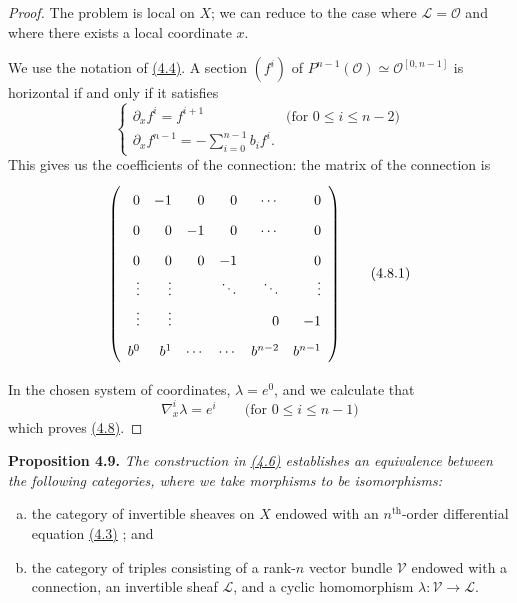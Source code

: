 \documentclass{report}
\newenvironment{itenv}[1]
  {\phantomsection\par\medskip\noindent\textbf{#1.}\itshape}
  {\medskip}
\newcommand{\scr}[1]{{\mathscr{#1}}}
\renewcommand{\cal}[1]{{\mathcal{#1}}}
\renewcommand{\leq}{\leqslant}
\newcommand{\oldpage}[1]{\marginpar{\footnotesize$\Big\vert$ \textit{p.~#1}}}
\begin{document}
\begin{proof}
  The problem is local on $X$;
  we can reduce to the case where $\scr{L}=\cal{O}$ and where there exists a local coordinate $x$.

  We use the notation of \hyperref[I.4.4]{(4.4)}.
  A section $(f^i)$ of $P^{n-1}(\cal{O})\simeq\cal{O}^{[0,n-1]}$ is horizontal if and only if it satisfies
  \[
    \begin{cases}
      \partial_x f^i = f^{i+1}
      & \mbox{(for $0\leq i\leq n-2$)}
    \\\partial_x f^{n-1} = -\sum_{i=0}^{n-1} b_i f^i.
    \end{cases}
  \]
  This gives us the coefficients of the connection: the matrix of the connection is
  \[
  \label{I.4.8.1}
    \left(
      \def\arraystretch{1.8}
      \begin{array}{rrrrrr}
        0 & -1 & 0 & 0 & \cdots & 0
      \\0 & 0 & -1 & 0 & \cdots & 0
      \\0 & 0 & 0 & -1 & & 0
      \\\vdots & \vdots & & \ddots & \ddots & \vdots
      \\\vdots & \vdots & & & 0 & -1
      \\b^0 & b^1 & \cdots & \cdots & b^{n-2} & b^{n-1}
      \end{array}
    \right)
  \tag{4.8.1}
  \]

\oldpage{27}
  In the chosen system of coordinates, $\lambda=e^0$, and we calculate that
  \[
    \nabla_x^i\lambda = e^i
    \qquad\mbox{(for $0\leq i\leq n-1$)}
  \]
  which proves \hyperref[I.4.8]{(4.8)}.
\end{proof}

\begin{itenv}{Proposition 4.9}
\label{I.4.9}
  The construction in \hyperref[I.4.6]{(4.6)} establishes an equivalence between the following categories, where we take morphisms to be isomorphisms:
  \begin{enumerate}[a)]
    \item the category of invertible sheaves on $X$ endowed with an $n^\mathrm{th}$-order differential equation \hyperref[I.4.3]{(4.3)} ; and
    \item the category of triples consisting of a rank-$n$ vector bundle $\cal{V}$ endowed with a connection, an invertible sheaf $\scr{L}$, and a cyclic homomorphism $\lambda\colon\cal{V}\to\scr{L}$.
  \end{enumerate}
\end{itenv}
\end{document}
